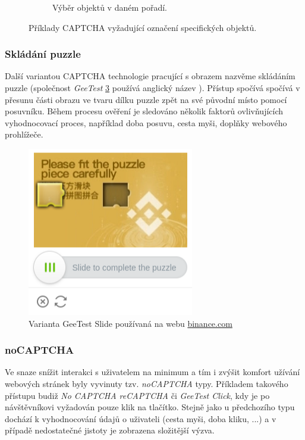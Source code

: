 \documentclass[
  field=ainfp,
  master=true,
  biblatex,
  sourcecodes=false,
  theorems=false,
  glossaries,
  index
]{kidiplom}
\begin{document}
\begin{figure}[H]
\begin{subfigure}{.5\textwidth}
  \caption{Výběr objektů v daném pořadí.}  \label{fig:geetest_selection}
\end{subfigure}
\caption{Příklady CAPTCHA vyžadující označení specifických objektů.}
\label{fig:image_selection}
\end{figure}

\subsubsection*{Skládání puzzle}
Další variantou CAPTCHA technologie pracující s obrazem nazvěme skládáním puzzle (společnost \textit{GeeTest} \ref{fig:captcha_geetest} používá anglický název ). Přístup spočívá spočívá v přesunu části obrazu ve tvaru dílku puzzle zpět na své původní místo pomocí posuvníku. Během procesu ověření je sledováno několik faktorů ovlivňujících vyhodnocovací proces, například doba posuvu, cesta myši, doplňky webového prohlížeče. 

\begin{figure}[H]
  \centering
  \includegraphics[scale=0.7]{images/geetest.png}
  \caption{Varianta GeeTest Slide používaná na webu \url{binance.com}}
  \label{fig:captcha_geetest}
\end{figure}

\subsubsection*{noCAPTCHA}
Ve snaze snížit interakci s uživatelem na minimum a tím i zvýšit komfort užívání webových stránek byly vyvinuty tzv. \textit{noCAPTCHA} typy. 
Příkladem takového přístupu budiž \textit{No CAPTCHA reCAPTCHA} či \textit{GeeTest Click}, kdy je po návštěvníkovi vyžadován pouze klik na tlačítko. Stejně jako u předchozího typu dochází k vyhodnocování údajů o uživateli (cesta myši, doba kliku, ...) a v případě nedostatečné jistoty je zobrazena složitější výzva.
\end{document}
